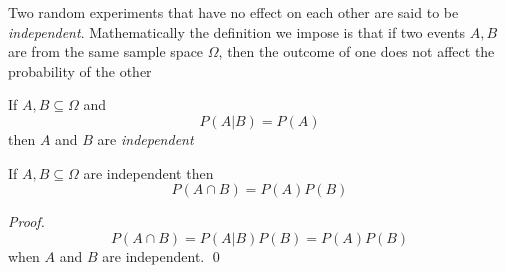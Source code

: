 \documentclass[../main.tex]{subfiles}
\begin{document}
Two random experiments that have no effect on each other are said to be \textit{independent}. Mathematically the definition we impose is that if two events $A,B$ are from the same sample space $\Omega$, then the outcome of one does not affect the probability of the other
\begin{definition}
	If $A,B \subseteq \Omega$ and $$P(A|B) = P(A)$$ then $A$ and $B$ are \textit{independent}
\end{definition}
\begin{corollary}
	If $A,B \subseteq \Omega$ are independent then
		\begin{equation}
		P(A \cap B) = P(A)P(B)
		\end{equation}
\end{corollary}
\begin{proof}
	$$P(A \cap B) = P(A | B)P(B) = P(A)P(B)$$ when
		$A$ and $B$ are independent. \hfill\qed
\end{proof}
\end{document}
